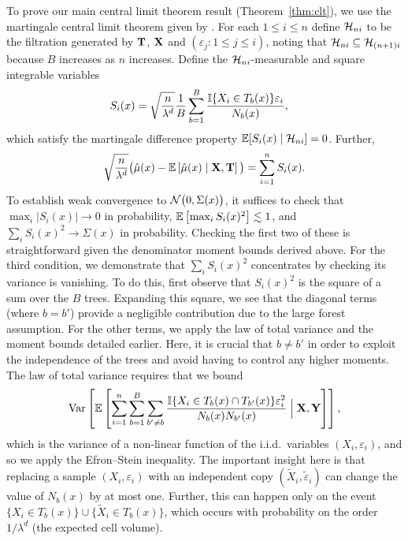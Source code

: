 To prove our main central limit theorem result
(Theorem~\ref{thm:clt}),
we use the martingale central limit theorem given by
\citet[Theorem~3.2]{hall2014martingale}.
For each $1 \leq i \leq n$ define
$\mathcal{H}_{n i}$ to be the filtration
generated by $\mathbf{T}$, $\mathbf{X}$ and
$(\varepsilon_j : 1 \leq j \leq i)$,
noting that $\mathcal{H}_{n i} \subseteq \mathcal{H}_{(n+1)i}$
because $B$ increases as $n$ increases.
Define the $\mathcal{H}_{n i}$-measurable and square integrable
variables
%
\begin{align*}
  S_i(x)
  &=
  \sqrt{\frac{n}{\lambda^d}}
  \frac{1}{B} \sum_{b=1}^B
  \frac{\mathbb{I} \{X_i \in T_b(x)\} \varepsilon_i}
  {N_{b}(x)},
\end{align*}
%
which satisfy the martingale
difference property
$\mathbb{E} [ S_i(x) \mid \mathcal{H}_{n i} ] = 0$.
Further,
%
\begin{align*}
  \sqrt{\frac{n}{\lambda^d}}
  \big(
    \hat\mu(x)
    - \mathbb{E}\left[
      \hat\mu(x) \mid \mathbf{X}, \mathbf{T}
    \right]
  \big)
  = \sum_{i=1}^n S_i(x).
\end{align*}
%
To establish weak convergence to $\mathcal{N}\big(0, \Sigma(x)\big)$,
it suffices to check that
%
$\max_i |S_i(x)| \to 0$ in probability,
$\mathbb{E}\left[\max_i S_i(x)^2\right] \lesssim 1$,
and $\sum_i S_i(x)^2 \to \Sigma(x)$ in probability.
Checking the first two of these is straightforward given the
denominator moment bounds derived above.
For the third condition, we demonstrate that
$\sum_i S_i(x)^2$ concentrates by checking its variance is vanishing.
To do this, first observe that $S_i(x)^2$ is the square of a sum
over the $B$ trees. Expanding this square, we see that the diagonal
terms (where $b = b'$) provide a negligible contribution due to
the large forest assumption.
For the other terms, we apply the law of total variance and the
moment bounds detailed earlier. Here, it is crucial that $b \neq b'$
in order to exploit the independence of the trees and avoid
having to control any higher moments.
The law of total variance requires that we bound
%
\begin{align*}
  \operatorname{Var} \left[
    \mathbb{E} \left[
      \sum_{i=1}^n
      \sum_{b=1}^B
      \sum_{b' \neq b}
      \frac{\mathbb{I}\{X_i \in T_b(x) \cap T_{b'}(x)\} \varepsilon_i^2}
      {N_{b}(x) N_{b'}(x)}
      \Bigm| \mathbf{X}, \mathbf{Y}
    \right]
  \right],
\end{align*}
%
which is the variance of a non-linear function of the i.i.d.\ variables
$(X_i, \varepsilon_i)$, and so we apply the Efron--Stein inequality.
The important insight here is that replacing a sample
$(X_i, \varepsilon_i)$ with an independent copy
$(\tilde X_i, \tilde \varepsilon_i)$ can change the value of
$N_b(x)$ by at most one.
Further, this can happen only on the event
$\{ X_i \in T_{b}(x) \} \cup \{ \tilde X_i \in T_{b}(x) \}$,
which occurs with probability on the order $1/\lambda^d$
(the expected cell volume).

